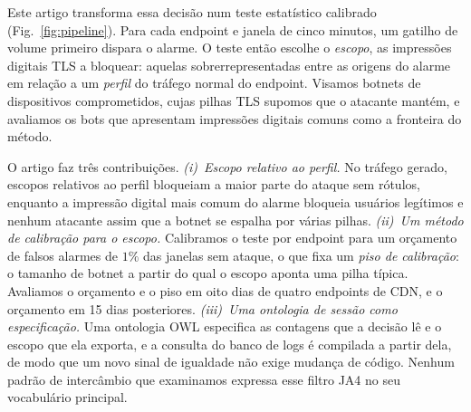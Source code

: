 \documentclass[conference,letterpaper,10pt]{IEEEtran}
\newcommand\1{\textit{(i)}}
\newcommand\2{\textit{(ii)}}
\newcommand\3{\textit{(iii)}}
\begin{document}
Este artigo transforma essa decisão num teste estatístico calibrado (Fig.~\ref{fig:pipeline}). Para cada endpoint e janela de cinco minutos, um gatilho de volume primeiro dispara o alarme. O teste então escolhe o \textit{escopo}, as impressões digitais TLS a bloquear: aquelas sobrerrepresentadas entre as origens do alarme em relação a um \textit{perfil} do tráfego normal do endpoint. Visamos botnets de dispositivos comprometidos, cujas pilhas TLS supomos que o atacante mantém, e avaliamos os bots que apresentam impressões digitais comuns como a fronteira do método.

O artigo faz três contribuições. \1~\textit{Escopo relativo ao perfil.} No tráfego gerado, escopos relativos ao perfil bloqueiam a maior parte do ataque sem rótulos, enquanto a impressão digital mais comum do alarme bloqueia usuários legítimos e nenhum atacante assim que a botnet se espalha por várias pilhas. \2~\textit{Um método de calibração para o escopo.} Calibramos o teste por endpoint para um orçamento de falsos alarmes de $1\%$ das janelas sem ataque, o que fixa um \textit{piso de calibração}: o tamanho de botnet a partir do qual o escopo aponta uma pilha típica. Avaliamos o orçamento e o piso em oito dias de quatro endpoints de CDN, e o orçamento em 15 dias posteriores. \3~\textit{Uma ontologia de sessão como especificação.} Uma ontologia OWL especifica as contagens que a decisão lê e o escopo que ela exporta, e a consulta do banco de logs é compilada a partir dela, de modo que um novo sinal de igualdade não exige mudança de código. Nenhum padrão de intercâmbio que examinamos expressa esse filtro JA4 no seu vocabulário principal.
\end{document}
